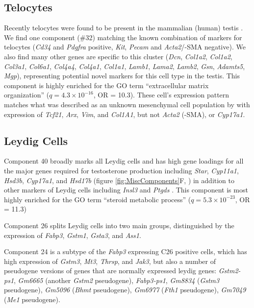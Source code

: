 \subsection{Telocytes}
Recently telocytes were found to be present in the mammalian (human) testis \parencite{Marini2018Reappraising, Kuroda2004Distribution}.
We find one component (\#32) matching the known combination of markers for telocytes (\textit{Cd34} and \textit{Pdgfra} positive, \textit{Kit}, \textit{Pecam} and \textit{Acta2}/\textalpha-SMA negative).
We also find many other genes are specific to this cluster (\textit{Dcn}, \textit{Col1a2}, \textit{Col1a2}, \textit{Col3a1}, \textit{Col6a1}, \textit{Col4a4}, \textit{Col4a1}, \textit{Col1a1}, \textit{Lamb1}, \textit{Lama2}, \textit{Lamb2}, \textit{Gsn}, \textit{Adamts5}, \textit{Mgp}), representing potential novel markers for this cell type in the testis.
This component is highly enriched for the GO term ``extracellular matrix organization'' ($q = 4.3\times10^{-16}$, OR = 10.3).
These cell's expression pattern matches what was described as an unknown mesenchymal cell population by \cite{Green2018Comprehensive} with expression of \textit{Tcf21}, \textit{Arx}, \textit{Vim}, and \textit{Col1A1}, but not \textit{Acta2} (\textalpha-SMA), or \textit{Cyp17a1}.


\subsection{Leydig Cells}
Component 40 broadly marks all Leydig cells and has high gene loadings for all the major genes required for testosterone production including \textit{Star}, \textit{Cyp11a1}, \textit{Hsd3b}, \textit{Cyp17a1}, and \textit{Hsd17b} (figure \ref{fig:MiscComponents}F, \cite{Stojkov2013Orally}) in addition to other markers of Leydig cells including \textit{Insl3} and \textit{Ptgds} \parencite{Balvers1998RelaxinLike, Baker2001Expression}.
This component is most highly enriched for the GO term ``steroid metabolic process'' ($q = 5.3\times10^{-23}$, OR = 11.3)

Component 26 splits Leydig cells into two main groups, distinguished by the expression of \textit{Fabp3}, \textit{Gstm1}, \textit{Gsta3}, and \textit{Ass1}.

Component 24 is a subtype of the \textit{Fabp3} expressing C26 positive cells, which has high expression of \textit{Gstm3}, \textit{Mt3}, \textit{Thrsp}, and \textit{Jak3}, but also a number of pseudogene versions of genes that are normally expressed leydig genes: \textit{Gstm2-ps1}, \textit{Gm6665} (another \textit{Gstm2} pseudogene), \textit{Fabp3-ps1}, \textit{Gm8834} (\textit{Gstm3} pseudogene), \textit{Gm5096} (\textit{Bhmt} pseudogene), \textit{Gm6977} (\textit{Fth1} pseudogene), \textit{Gm7049} (\textit{Me1} pseudogene).

